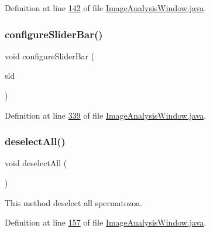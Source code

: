 Definition at line \hyperlink{_image_analysis_window_8java_source_l00142}{142} of file \hyperlink{_image_analysis_window_8java_source}{Image\+Analysis\+Window.\+java}.

\hypertarget{classgui_1_1_image_analysis_window_a59aed828ede257a7487f529a114dbf3d}{}\label{classgui_1_1_image_analysis_window_a59aed828ede257a7487f529a114dbf3d} 
\subsubsection{\texorpdfstring{configure\+Slider\+Bar()}{configureSliderBar()}}
{\footnotesize\ttfamily void configure\+Slider\+Bar (\begin{DoxyParamCaption}\item[{J\+Slider}]{sld }\end{DoxyParamCaption})\hspace{0.3cm}{\ttfamily [private]}}



Definition at line \hyperlink{_image_analysis_window_8java_source_l00339}{339} of file \hyperlink{_image_analysis_window_8java_source}{Image\+Analysis\+Window.\+java}.

\hypertarget{classgui_1_1_image_analysis_window_a2d0abb2ca6c5355bd49023f16f185293}{}\label{classgui_1_1_image_analysis_window_a2d0abb2ca6c5355bd49023f16f185293} 
\subsubsection{\texorpdfstring{deselect\+All()}{deselectAll()}}
{\footnotesize\ttfamily void deselect\+All (\begin{DoxyParamCaption}{ }\end{DoxyParamCaption})}

This method deselect all spermatozoa. 

Definition at line \hyperlink{_image_analysis_window_8java_source_l00157}{157} of file \hyperlink{_image_analysis_window_8java_source}{Image\+Analysis\+Window.\+java}.

\hypertarget{classgui_1_1_image_analysis_window_af3a8c3ee2b9b6c5c415df634105b5945}{}\label{classgui_1_1_image_analysis_window_af3a8c3ee2b9b6c5c415df634105b5945} 
